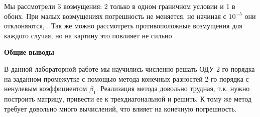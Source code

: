 \documentclass{article}
\begin{document}
	Мы рассмотрели 3 возмущения: 2 только в одном граничном условии и 1 в обоих. При малых возмущениях погрешность не меняется, но начиная с $10^{-5}$ они отклоняются, . Так же можно рассмотреть противоположные возмущения для каждого случая, но на картину это повлияет не сильно
	\begin{center} \textbf{Общие выводы}\end{center}
	В данной лабораторной работе мы научились численно решать ОДУ 2-го порядка на заданном промежутке с помощью метода конечных разностей 2-го порядка с ненулевым коэффициентом $\beta_1$. Реализация метода довольно трудная, т.к. нужно построить матрицу, привести ее к трехдиагональной и решить. К тому же метод требует довольно много вычислений, что влияет на конечную погрешность.
\end{document}

